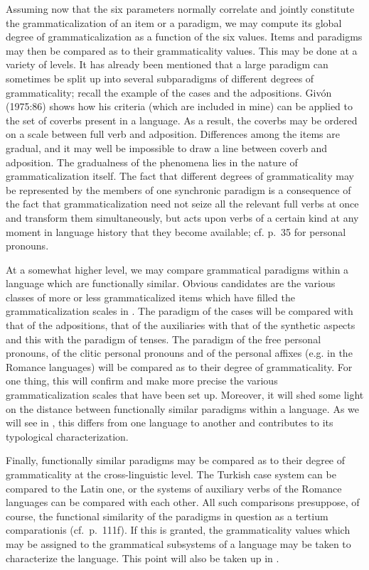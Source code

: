 Assuming now that the six parameters normally correlate and jointly constitute the grammaticalization of an item or a paradigm, we may compute its global degree of grammaticalization as a function of the six values. Items and paradigms may then be compared as to their grammaticality values. This may be done at a variety of levels. It has already been mentioned that a large paradigm can sometimes be split up into several subparadigms of different degrees of grammaticality; recall the example of the cases and the adpositions. Givón (1975:86) shows how his criteria (which are included in mine) can be applied to the set of coverbs present in a language. As a result, the coverbs may be ordered on a scale between full verb and adposition. Differences among the items are gradual, and it may well be impossible to draw a line between coverb and adposition. The gradualness of the phenomena lies in the nature of grammaticalization itself. The fact that different degrees of grammaticality may be represented by the members of one synchronic paradigm is a consequence of the fact that grammaticalization need not seize all the relevant full verbs at once and transform them simultaneously, but acts upon verbs of a certain kind at any moment in language history that they become available; cf. p.~35 for personal pronouns.

At a somewhat higher level, we may compare grammatical paradigms within a language which are functionally similar. Obvious candidates are the various classes of more or less grammaticalized items which have filled the grammaticalization scales in . The paradigm of the cases will be compared with that of the adpositions, that of the auxiliaries with that of the synthetic aspects and this with the paradigm of tenses. The paradigm of the free personal pronouns, of the clitic personal pronouns and of the personal affixes (e.g. in the Romance languages) will be compared as to their degree of grammaticality. For one thing, this will confirm and make more precise the various grammaticalization scales that have been set up. Moreover, it will shed some light on the distance between functionally similar paradigms within a language. As we will see in , this differs from one language to another and contributes to its typological characterization.

Finally, functionally similar paradigms may be compared as to their degree of grammaticality at the cross-linguistic level. The Turkish case system can be compared to the Latin one, or the systems of auxiliary verbs of the Romance languages can be compared with each other. All such comparisons presuppose, of course, the functional similarity of the paradigms in question as a tertium comparationis (cf.~p.~111f). If this is granted, the grammaticality values which may be assigned to the grammatical subsystems of a language may be taken to characterize the language. This point will also be taken up in .


